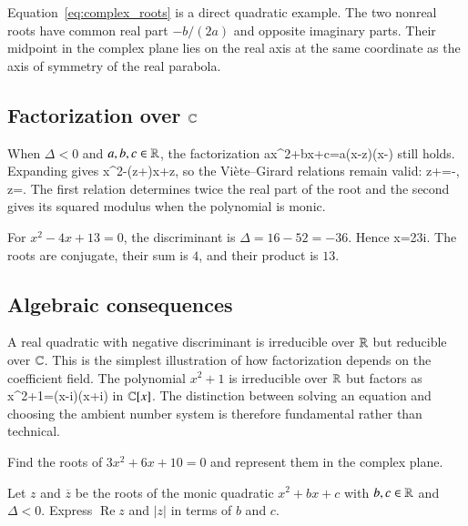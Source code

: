 Equation~\eqref{eq:complex_roots} is a direct quadratic example. The two nonreal roots have common real part $-b/(2a)$ and opposite imaginary parts. Their midpoint in the complex plane lies on the real axis at the same coordinate as the axis of symmetry of the real parabola.

\subsection{Factorization over $\mathbb{C}$}

When $\Delta<0$ and $a,b,c\in\mathbb{R}$, the factorization
\be
ax^2+bx+c=a(x-z)(x-)
\ee
still holds. Expanding gives
\be
x^2-(z+)x+z,
\ee
so the Vi\`ete--Girard relations remain valid:
\be
z+=-,
\qquad
z=.
\ee
The first relation determines twice the real part of the root and the second gives its squared modulus when the polynomial is monic.

\begin{example}
For $x^2-4x+13=0$, the discriminant is $\Delta=16-52=-36$. Hence
\be
x=2\pm3i.
\ee
The roots are conjugate, their sum is $4$, and their product is $13$.
\end{example}

\subsection{Algebraic consequences}

A real quadratic with negative discriminant is irreducible over $\mathbb{R}$ but reducible over $\mathbb{C}$. This is the simplest illustration of how factorization depends on the coefficient field. The polynomial $x^2+1$ is irreducible over $\mathbb{R}$ but factors as
\be
x^2+1=(x-i)(x+i)
\ee
in $\mathbb{C}[x]$. The distinction between solving an equation and choosing the ambient number system is therefore fundamental rather than technical.

\begin{exercise}
Find the roots of $3x^2+6x+10=0$ and represent them in the complex plane.
\end{exercise}

\begin{exercise}
Let $z$ and $\overline z$ be the roots of the monic quadratic $x^2+bx+c$ with $b,c\in\mathbb{R}$ and $\Delta<0$. Express $\operatorname{Re}z$ and $|z|$ in terms of $b$ and $c$.
\end{exercise}

